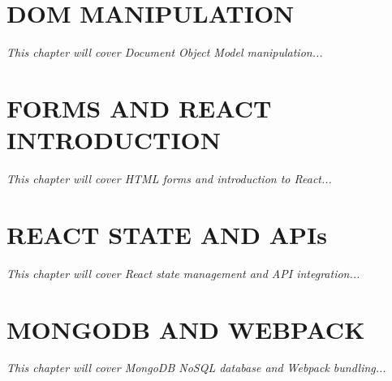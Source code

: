 \documentclass[12pt,a4paper,oneside]{book}
\begin{document}
\chapter{DOM MANIPULATION}
\textit{This chapter will cover Document Object Model manipulation...}

\chapter{FORMS AND REACT INTRODUCTION}
\textit{This chapter will cover HTML forms and introduction to React...}

\chapter{REACT STATE AND APIs}
\textit{This chapter will cover React state management and API integration...}

\chapter{MONGODB AND WEBPACK}
\textit{This chapter will cover MongoDB NoSQL database and Webpack bundling...}
\end{document}
